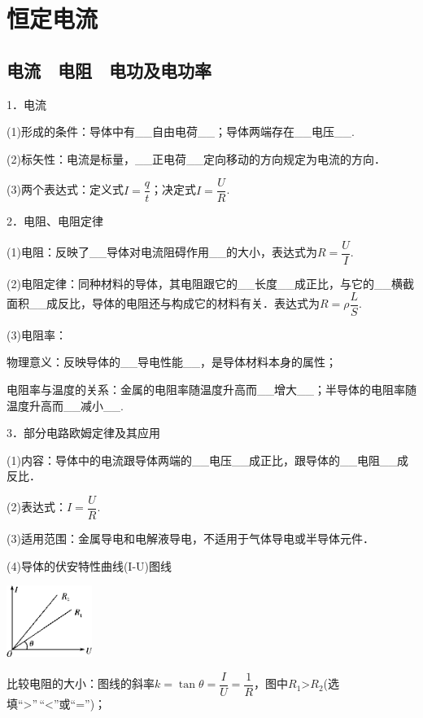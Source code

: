 \documentclass[cn,10.5pt,chinese,mac,chinesefont=founder]{elegantbook}
\begin{document}
\chapter{恒定电流}

\section{电流　电阻　电功及电功率}





1．电流

(1)形成的条件：导体中有\_\_自由电荷\_\_；导体两端存在\_\_电压\_\_.

(2)标矢性：电流是标量，\_\_正电荷\_\_定向移动的方向规定为电流的方向．

(3)两个表达式：定义式$I=\dfrac{q}{t}$；决定式$I=\dfrac{U}{R}$.

2．电阻、电阻定律

(1)电阻：反映了\_\_导体对电流阻碍作用\_\_的大小，表达式为$R=\dfrac{U}{I}$.

(2)电阻定律：同种材料的导体，其电阻跟它的\_\_长度\_\_成正比，与它的\_\_横截面积\_\_成反比，导体的电阻还与构成它的材料有关．表达式为$R=\rho \dfrac{L}{S}$.

(3)电阻率：

物理意义：反映导体的\_\_导电性能\_\_，是导体材料本身的属性；

电阻率与温度的关系：金属的电阻率随温度升高而\_\_增大\_\_；半导体的电阻率随温度升高而\_\_减小\_\_.

3．部分电路欧姆定律及其应用

(1)内容：导体中的电流跟导体两端的\_\_电压\_\_成正比，跟导体的\_\_电阻\_\_成反比．

(2)表达式：$I=\dfrac{U}{R}$.

(3)适用范围：金属导电和电解液导电，不适用于气体导电或半导体元件．

(4)导体的伏安特性曲线(I-U)图线

\begin{center}\includegraphics[width=1.09444in,height=0.91528in]{media/image307.png}\end{center}

比较电阻的大小：图线的斜率$k=\tan \theta=\dfrac{I}{U}=\dfrac{1}{R}$，图中$R_1$\textgreater$R_2$(选填``\textgreater''\,``\textless''或``='')；
\end{document}
